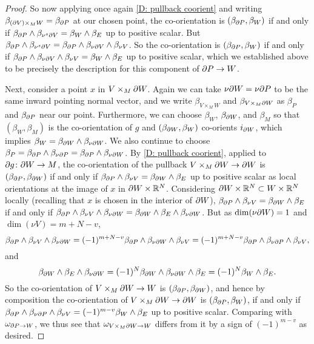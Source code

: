\begin{proof}
	So now applying once again \cref{D: pullback coorient} and writing $\beta_{(\partial V) \times_M W} = \beta_{\partial P}$ at our chosen point, the co-orientation is $(\beta_{\partial P},\beta_W)$ if and only if $\beta_{\partial P} \wedge \beta_{\nu^s\partial V} = \beta_W \wedge \beta_E$ up to positive scalar.
	But $\beta_{\partial P} \wedge \beta_{\nu^s\partial V} = \beta_{\partial P} \wedge \beta_{\nu\partial V} \wedge \beta_{\nu V}$.
	So the co-orientation is $(\beta_{\partial P},\beta_W)$ if and only if $\beta_{\partial P} \wedge \beta_{\nu\partial V} \wedge \beta_{\nu V} = \beta_W \wedge \beta_E$ up to positive scalar, which we established above to be precisely the description for this component of $\partial P \to W$.

	Next, consider a point $x$ in $V \times_M \partial W$.
	Again we can take $\nu\partial W = \nu \partial P$ to be the same inward pointing normal vector, and we write $\beta_{V \times_M W}$ and $\beta_{V \times_M \partial W}$ as $\beta_P$ and $\beta_{\partial P}$ near our point.
	Furthermore, we can choose $\beta_{W}$, $\beta_{\partial W}$, and $\beta_M$ so that $(\beta_W,\beta_M)$ is the co-orientation of $g$ and $(\beta_{\partial W},\beta_W)$ co-orients $i_{\partial W}$, which implies $\beta_W = \beta_{\partial W} \wedge \beta_{\nu\partial W}$.
	We also continue to choose $\beta_{P} = \beta_{\partial P} \wedge \beta_{\nu \partial P} = \beta_{\partial P} \wedge \beta_{\nu \partial W}$.
	By \cref{D: pullback coorient}, applied to $\partial g \colon \partial W \to M$, the co-orientation of the pullback $V \times_M \partial W \to \partial W$ is $(\beta_{\partial P},\beta_{\partial W})$ if and only if $\beta_{\partial P} \wedge \beta_{\nu V} = \beta_{\partial W} \wedge \beta_E$ up to positive scalar as local orientations at the image of $x$ in $\partial W \times \mathbb{R}^N$.
	Considering $\partial W \times \mathbb{R}^N \subset W \times \mathbb{R}^N$ locally (recalling that $x$ is chosen in the interior of $\partial W$), $\beta_{\partial P} \wedge \beta_{\nu V} = \beta_{\partial W} \wedge \beta_E$ if and only if $\beta_{\partial P} \wedge \beta_{\nu V} \wedge \beta_{\nu\partial W} = \beta_{\partial W} \wedge \beta_E \wedge \beta_{\nu\partial W}$.
	But as $\dim(\nu\partial W) = 1$ and $\dim(\nu V) = m+N-v$,
	$$\beta_{\partial P} \wedge \beta_{\nu V} \wedge \beta_{\nu\partial W} = (-1)^{m+N-v}\beta_{\partial P} \wedge \beta_{\nu\partial W} \wedge \beta_{\nu V} = (-1)^{m+N-v}\beta_{\partial P} \wedge \beta_{\nu\partial P} \wedge \beta_{\nu V},$$
	and
	$$\beta_{\partial W} \wedge \beta_E \wedge \beta_{\nu\partial W} = (-1)^N\beta_{\partial W} \wedge \beta_{\nu\partial W} \wedge \beta_E = (-1)^N\beta_{W} \wedge \beta_E.$$
	So the co-orientation of $V \times_M \partial W \to W$ is $(\beta_{\partial P},\beta_{\partial W})$, and hence by composition the co-orientation of $V \times_M \partial W \to \partial W$ is $(\beta_{\partial P},\beta_{W})$,
	if and only if $\beta_{\partial P} \wedge \beta_{\nu\partial P} \wedge \beta_{\nu V} = (-1)^{m-v}\beta_{W} \wedge \beta_E$ up to positive scalar.
	Comparing with $\omega_{\partial P \to W}$, we thus see that $\omega_{V \times_M \partial W \to W}$ differs from it by a sign of $(-1)^{m-v}$ as desired.
\end{proof}

